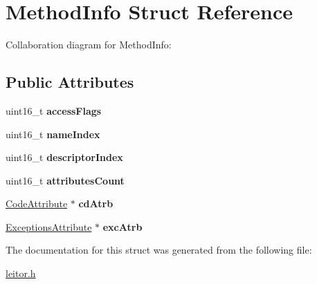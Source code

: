 \hypertarget{structMethodInfo}{}\section{Method\+Info Struct Reference}
\label{structMethodInfo}


Collaboration diagram for Method\+Info\+:
\subsection*{Public Attributes}
\begin{DoxyCompactItemize}
\item 
\mbox{\label{structMethodInfo_a1075fd2ba433b27d9b04dec3a78de9f3}} 
uint16\+\_\+t {\bfseries access\+Flags}
\item 
\mbox{\label{structMethodInfo_a946349e82f47156b63c58e57061d6891}} 
uint16\+\_\+t {\bfseries name\+Index}
\item 
\mbox{\label{structMethodInfo_a4be51921e4147d189cc314b9b3a75161}} 
uint16\+\_\+t {\bfseries descriptor\+Index}
\item 
\mbox{\label{structMethodInfo_a0980de52cac7b97181222b39b28e0fe0}} 
uint16\+\_\+t {\bfseries attributes\+Count}
\item 
\mbox{\label{structMethodInfo_a6e5b903a4ae8fdf418b3955b93ded1c4}} 
\hyperlink{structCodeAttribute}{Code\+Attribute} $\ast$ {\bfseries cd\+Atrb}
\item 
\mbox{\label{structMethodInfo_ae09864e7cbb1f6423209b89a1ecb70a8}} 
\hyperlink{structExceptionsAttribute}{Exceptions\+Attribute} $\ast$ {\bfseries exc\+Atrb}
\end{DoxyCompactItemize}


The documentation for this struct was generated from the following file\+:\begin{DoxyCompactItemize}
\item 
\hyperlink{leitor_8h}{leitor.\+h}\end{DoxyCompactItemize}
